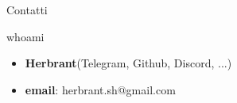 \begin{frame}{Contatti}

\begin{block}{whoami}
    \begin{itemize}
        \item \textbf{Herbrant}(Telegram, Github, Discord, ...)
        \item \textbf{email}: herbrant.sh@gmail.com
    \end{itemize}
\end{block}
       
\end{frame}